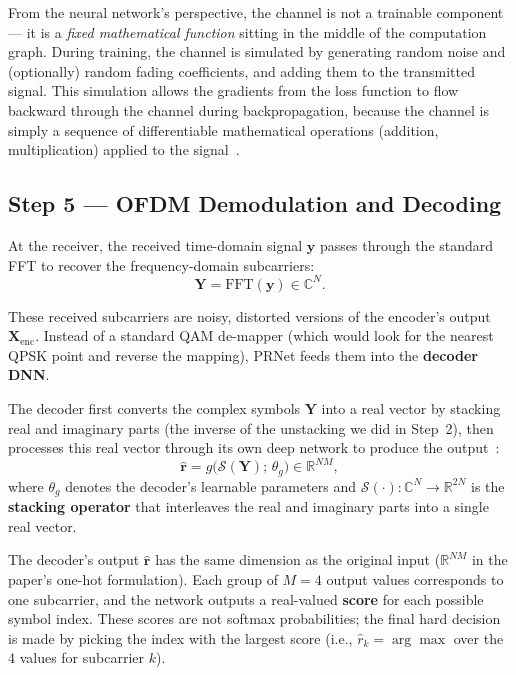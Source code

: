 \begin{keyinsight}
    From the neural network's perspective, the channel is not a trainable
    component --- it is a \emph{fixed mathematical function} sitting in the
    middle of the computation graph.  During training, the channel is
    simulated by generating random noise and (optionally) random fading
    coefficients, and adding them to the transmitted signal.  This simulation
    allows the gradients from the loss function to flow backward through the
    channel during backpropagation, because the channel is simply a sequence
    of differentiable mathematical operations (addition, multiplication)
    applied to the signal~\cite{kim2017novel}.
\end{keyinsight}


\subsection{Step 5 --- OFDM Demodulation and Decoding}

At the receiver, the received time-domain signal $\bm{y}$ passes through
the standard FFT to recover the frequency-domain subcarriers:
\begin{equation}
    \bm{Y} = \mathrm{FFT}(\bm{y}) \in \mathbb{C}^{N}.
    \label{eq:prnet_fft}
\end{equation}

These received subcarriers are noisy, distorted versions of the encoder's
output $\bm{X}_{\mathrm{enc}}$.  Instead of a standard QAM de-mapper
(which would look for the nearest QPSK point and reverse the mapping),
PRNet feeds them into the \textbf{decoder DNN}.

The decoder first converts the complex symbols $\bm{Y}$ into a real
vector by stacking real and imaginary parts (the inverse of the
unstacking we did in Step~2), then processes this real vector through
its own deep network to produce the
output~\cite{kim2017novel}:
\begin{equation}
    \hat{\bm{r}} = g\bigl(\mathcal{S}(\bm{Y});\,\theta_g\bigr)
    \in \mathbb{R}^{NM},
    \label{eq:prnet_decoder_output}
\end{equation}
where $\theta_g$ denotes the decoder's learnable parameters and
$\mathcal{S}(\cdot) : \mathbb{C}^{N} \to \mathbb{R}^{2N}$ is the
\textbf{stacking operator} that interleaves the real and imaginary parts
into a single real vector.

The decoder's output $\hat{\bm{r}}$ has the same dimension as the original
input ($\mathbb{R}^{NM}$ in the paper's one-hot formulation).  Each group of
$M = 4$ output values corresponds to one subcarrier, and the network outputs a
real-valued \textbf{score} for each possible symbol index.  These scores are
not softmax probabilities; the final hard decision is made by picking the
index with the largest score (i.e., $\hat{r}_k = \arg\max$ over the 4 values
for subcarrier $k$).

